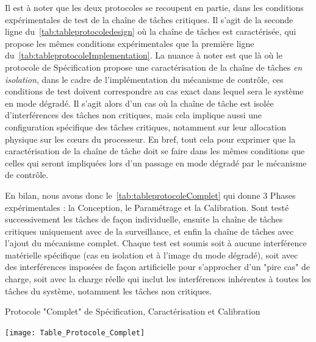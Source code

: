 \documentclass[french, a4paper, 11pt, twoside, pdftex]{StyleThese}
\begin{document}
    Il est à noter que les deux protocoles se recoupent en partie, dans les conditions expérimentales de test de la chaîne de tâches critiques. Il s'agit de la seconde ligne du~\autoref{tab:tableprotocoledesign} où la chaîne de tâches est caractérisée, qui propose les mêmes conditions expérimentales que la première ligne du~\autoref{tab:tableprotocoleImplementation}. La nuance à noter est que là où le protocole de Spécification propose une caractérisation de la chaîne de tâches \textit{en isolation}, dans le cadre de l'implémentation du mécanisme de contrôle, ces conditions de test doivent correspondre au cas exact dans lequel sera le système en mode dégradé. Il s'agit alors d'un cas où la chaîne de tâche est isolée d'interférences des tâches non critiques, mais cela implique aussi une configuration spécifique des tâches critiques, notamment sur leur allocation physique sur les cœurs du processeur. 
    En bref, tout cela pour exprimer que la caractérisation de la chaîne de tâche doit se faire dans les mêmes conditions que celles qui seront impliquées lors d'un passage en mode dégradé par le mécanisme de contrôle.
    
   	En bilan, nous avons donc le~\autoref{tab:tableprotocoleComplet} qui donne 3 Phases expérimentales : la Conception, le Paramétrage et la Calibration. Sont testé successivement les tâches de façon individuelle, ensuite la chaîne de tâches critiques uniquement avec de la surveillance, et enfin la chaîne de tâches avec l'ajout du mécanisme complet. Chaque test est soumis soit à aucune interférence matérielle spécifique (cas en isolation et à l'image du mode dégradé), soit avec des interférences imposées de façon artificielle pour s'approcher d'un "pire cas" de charge, soit avec la charge réelle qui inclut les interférences inhérentes à toutes les tâches du système, notamment les tâches non critiques.
   	
   	\begin{table}[ht]
   		\centering
   		\caption{Protocole "Complet" de Spécification, Caractérisation et Calibration}
   		\label{tab:tableprotocoleComplet}
   		\texttt{[image: Table\_Protocole\_Complet]}
   	\end{table}
   	
\ifdefined{}
\else


\end{document}
